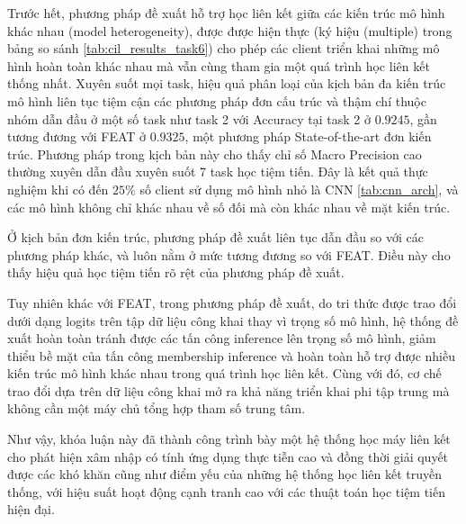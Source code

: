 Trước hết, phương pháp đề xuất hỗ trợ học liên kết giữa các kiến trúc mô hình khác nhau (model heterogeneity), được được hiện thực (ký hiệu (multiple) trong bảng so sánh \ref{tab:cil_results_task6}) cho phép các client triển khai những mô hình hoàn toàn khác nhau mà vẫn cùng tham gia một quá trình học liên kết thống nhất. Xuyên suốt mọi task, hiệu quả phân loại của kịch bản đa kiến trúc mô hình liên tục tiệm cận các phương pháp đơn cấu trúc và thậm chí thuộc nhóm dẫn đầu ở một số task như task 2 với Accuracy tại task 2 ở $0.9245$, gần tương đương với FEAT ở $0.9325$, một phương pháp State-of-the-art đơn kiến trúc. Phương pháp trong kịch bản này cho thấy chỉ số Macro Precision cao thường xuyên dẫn đầu xuyên suốt 7 task học tiệm tiến. Đây là kết quả thực nghiệm khi có đến $25\%$ số client sử dụng mô hình nhỏ là CNN \ref{tab:cnn_arch}, và các mô hình không chỉ khác nhau về số đối mà còn khác nhau về mặt kiến trúc.

Ở kịch bản đơn kiến trúc, phương pháp đề xuất liên tục dẫn đầu so với các phương pháp khác, và luôn nằm ở mức tương đương so với FEAT. Điều này cho thấy hiệu quả học tiệm tiến rõ rệt của phương pháp đề xuất.

Tuy nhiên khác với FEAT, trong phương pháp đề xuất, do tri thức được trao đổi dưới dạng logits trên tập dữ liệu công khai thay vì trọng số mô hình, hệ thống đề xuất hoàn toàn tránh được các tấn công inference lên trọng số mô hình, giảm thiểu bề mặt của tấn công membership inference và hoàn toàn hỗ trợ được nhiều kiến trúc mô hình khác nhau trong quá trình học liên kết. Cùng với đó, cơ chế trao đổi dựa trên dữ liệu công khai mở ra khả năng triển khai phi tập trung mà không cần một máy chủ tổng hợp tham số trung tâm.


Như vậy, khóa luận này đã thành công trình bày một hệ thống học máy liên kết cho phát hiện xâm nhập có tính ứng dụng thực tiễn cao và đồng thời giải quyết được các khó khăn cũng như điểm yếu của những hệ thống học liên kết truyền thống, với hiệu suất hoạt động cạnh tranh cao với các thuật toán học tiệm tiến hiện đại.